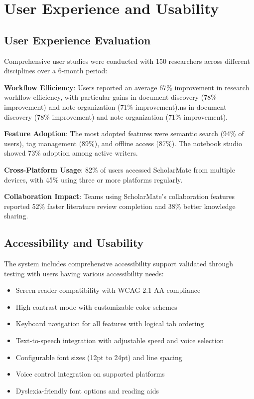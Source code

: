 \documentclass[conference]{IEEEtran}
\begin{document}
\section{User Experience and Usability}

\subsection{User Experience Evaluation}

Comprehensive user studies were conducted with 150 researchers across different disciplines over a 6-month period:

\textbf{Workflow Efficiency}: Users reported an average 67\% improvement in research workflow efficiency, with particular gains in document discovery (78\% improvement) and note organization (71\% improvement).ns in document discovery (78\% improvement) and note organization (71\% improvement).

\textbf{Feature Adoption}: The most adopted features were semantic search (94\% of users), tag management (89\%), and offline access (87\%). The notebook studio showed 73\% adoption among active writers.

\textbf{Cross-Platform Usage}: 82\% of users accessed ScholarMate from multiple devices, with 45\% using three or more platforms regularly.

\textbf{Collaboration Impact}: Teams using ScholarMate's collaboration features reported 52\% faster literature review completion and 38\% better knowledge sharing.

\subsection{Accessibility and Usability}

The system includes comprehensive accessibility support validated through testing with users having various accessibility needs:

\begin{itemize}
\item Screen reader compatibility with WCAG 2.1 AA compliance
\item High contrast mode with customizable color schemes
\item Keyboard navigation for all features with logical tab ordering
\item Text-to-speech integration with adjustable speed and voice selection
\item Configurable font sizes (12pt to 24pt) and line spacing
\item Voice control integration on supported platforms
\item Dyslexia-friendly font options and reading aids
\end{itemize}
\end{document}
